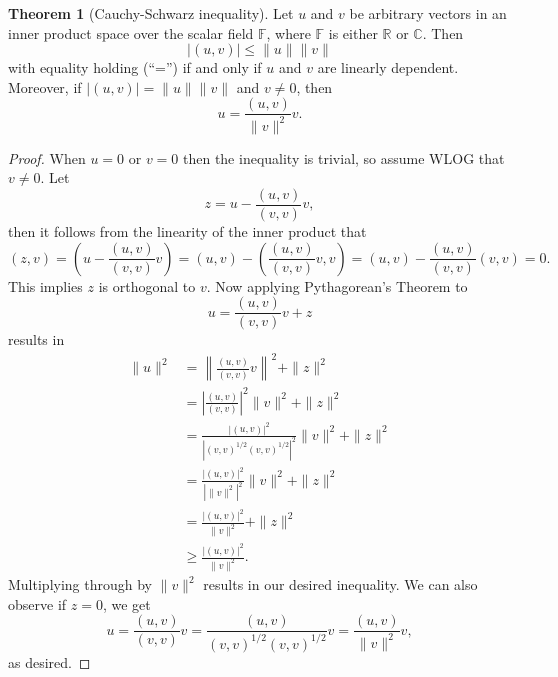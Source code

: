 \documentclass[11pt]{article}
\theoremstyle{definition}
\newtheorem*{theorem}{Theorem}
\begin{document}
\begin{theorem}[Cauchy-Schwarz inequality]
	Let $u$ and $v$ be arbitrary vectors in an inner product space over the scalar field $\mathbb{F}$,
	where $\mathbb{F}$ is either $\mathbb{R}$ or $\mathbb{C}$. Then
	\begin{equation*}
		|(u,v)| \leq \|u\|\|v\|
	\end{equation*}
	with equality holding (``='') if and only if $u$ and $v$ are linearly dependent.
	Moreover, if $|(u,v)| = \|u\|\|v\|$ and $v\not=0$, then
	\begin{equation*}
		u = \frac{(u,v)}{\|v\|^2}v.
	\end{equation*}
\end{theorem}
\begin{proof}
	When $u=0$ or $v=0$ then the inequality is trivial, so assume WLOG that $v\not=0$.
	Let
	\begin{equation*}
		z = u - \frac{(u,v)}{(v,v)}v,
	\end{equation*}
	then it follows from the linearity of the inner product that
	\begin{equation*}
		(z,v) = \left(u - \frac{(u,v)}{(v,v)}v\right) = (u,v) - \left(\frac{(u,v)}{(v,v)}v,v\right) = (u,v) - \frac{(u,v)}{(v,v)}(v,v) = 0.
	\end{equation*}
	This implies $z$ is orthogonal to $v$. Now applying Pythagorean's Theorem to
	\begin{equation*}
		u = \frac{(u,v)}{(v,v)}v + z
	\end{equation*}
	results in
	\begin{equation*}
		\begin{aligned}
			\|u\|^2 &= \left\|\frac{(u,v)}{(v,v)}v\right\|^2 + \|z\|^2 \\
				&= \left|\frac{(u,v)}{(v,v)}\right|^2 \|v\|^2 + \|z\|^2 \\
				&= \frac{|(u,v)|^2}{|(v,v)^{1/2}(v,v)^{1/2}|^2}\|v\|^2 + \|z\|^2 \\
				&= \frac{|(u,v)|^2}{|\|v\|^2|^2}\|v\|^2 + \|z\|^2 \\
				&= \frac{|(u,v)|^2}{\|v\|^2} + \|z\|^2 \\
				&\geq \frac{|(u,v)|^2}{\|v\|^2}.
		\end{aligned}
	\end{equation*}
	Multiplying through by $\|v\|^2$ results in our desired inequality. We can also observe if $z=0$, we get
	\begin{equation*}
		u = \frac{(u,v)}{(v,v)}v = \frac{(u,v)}{(v,v)^{1/2}(v,v)^{1/2}}v = \frac{(u,v)}{\|v\|^2}v,
	\end{equation*}
	as desired.
\end{proof}
\end{document}
